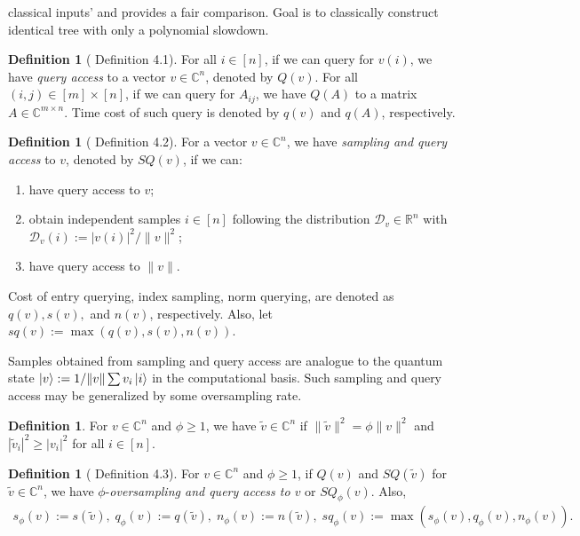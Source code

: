 \documentclass[10pt,twoside,reqno]{amsart} %
\theoremstyle{plain}
\theoremstyle{definition}
\newtheorem{defn}[thm]{Definition}
\begin{document}
classical inputs' and provides a fair comparison. Goal is to classically
construct identical tree with only a polynomial slowdown. 
\begin{defn}[\cite{tang2023} Definition 4.1]
  For all $i\in[n]$, if we can query for $v(i)$, we have \emph{query access}
  to a vector $v\in\mathbb{C}^n$, denoted by $Q(v)$. For all 
  $(i,j)\in[m]\times[n]$, if we can query for $A_{ij}$, we have $Q(A)$ to
  a matrix $A\in\mathbb{C}^{m\times n}$. Time cost of such query is denoted
  by $q(v)$ and $q(A)$, respectively.
\end{defn}
\begin{defn}[\cite{tang2023} Definition 4.2]
  For a vector $v\in\mathbb{C}^n$, we have \emph{sampling and query access} to
  $v$, denoted by $SQ(v)$, if we can:
  \begin{enumerate}
    \item have query access to $v$;
    \item obtain independent samples $i\in[n]$ following the distribution
      $\mathcal{D}_v\in\mathbb{R}^n$ with $\mathcal{D}_v(i):=|v(i)|^2/\|v\|^2$;
    \item have query access to $\|v\|$.
  \end{enumerate}
  Cost of entry querying, index sampling, norm querying, are denoted as
  $q(v),s(v),$ and $n(v)$, respectively. Also, let $sq(v):=\max(q(v),s(v),n(v))$.
\end{defn}
Samples obtained from sampling and query access are analogue to the quantum
state $\ket{v} := 1/\|v\|\sum v_i\ket{i}$ in the computational basis. Such
sampling and query access may be generalized by some oversampling rate.
\begin{defn}
  For $v\in\mathbb{C}^n$ and $\phi\geq1$, we have
  $\widetilde{v}\in\mathbb{C}^n$ if $\|\widetilde{v}\|^2=\phi\|v\|^2$ and
  $|\widetilde{v}_i|^2\geq |v_i|^2$ for all $i\in[n]$.
\end{defn}
\begin{defn}[\cite{tang2023} Definition 4.3]
  For $v\in\mathbb{C}^n$ and $\phi\geq1$, if $Q(v)$ and 
  $SQ(\widetilde{v})$ for $\widetilde{v}\in\mathbb{C}^n$, we have 
  $\phi$-\emph{oversampling and query access to $v$} or $SQ_{\phi}(v)$. Also,
  \begin{align*}
    s_{\phi}(v) := s(\widetilde{v}),\;
    q_{\phi}(v) := q(\widetilde{v}),\;
    n_{\phi}(v) := n(\widetilde{v}),\;
    sq_{\phi}(v) := \max(s_{\phi}(v),q_{\phi}(v),n_{\phi}(v)).
  \end{align*}
\end{defn}
\end{document}
